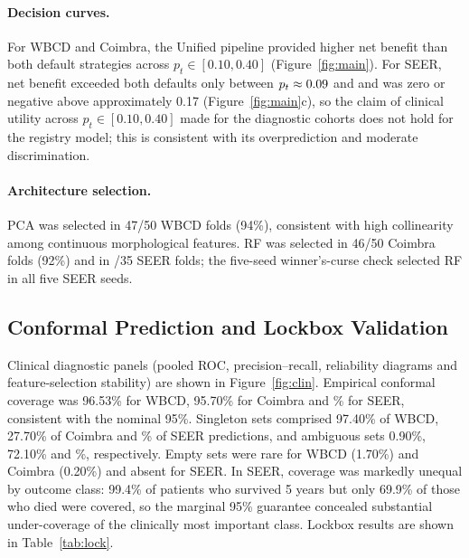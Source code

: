\documentclass[11pt,a4paper]{article}
\begin{document}
\paragraph{Decision curves.} For WBCD and Coimbra, the Unified pipeline provided higher net benefit than both default strategies across $p_t\in[0.10,0.40]$ (Figure~\ref{fig:main}). For SEER, net benefit exceeded both defaults only between $p_t\approx0.09$ and \seerDCAhi{} and was zero or negative above approximately 0.17 (Figure~\ref{fig:main}c), so the claim of clinical utility across $p_t\in[0.10,0.40]$ made for the diagnostic cohorts does not hold for the registry model; this is consistent with its overprediction and moderate discrimination.

\paragraph{Architecture selection.} PCA was selected in 47/50 WBCD folds (94\%), consistent with high collinearity among continuous morphological features. RF was selected in 46/50 Coimbra folds (92\%) and in \seerRFfolds/35 SEER folds; the five-seed winner's-curse check selected RF in all five SEER seeds.

\subsection{Conformal Prediction and Lockbox Validation}\label{sec:conformal-prediction-and-lockb}
Clinical diagnostic panels (pooled ROC, precision--recall, reliability diagrams and feature-selection stability) are shown in Figure~\ref{fig:clin}. Empirical conformal coverage was 96.53\% for WBCD, 95.70\% for Coimbra and \seerConfCov\% for SEER, consistent with the nominal 95\%. Singleton sets comprised 97.40\% of WBCD, 27.70\% of Coimbra and \seerConfSingle\% of SEER predictions, and ambiguous sets 0.90\%, 72.10\% and \seerConfAmb\%, respectively. Empty sets were rare for WBCD (1.70\%) and Coimbra (0.20\%) and absent for SEER. In SEER, coverage was markedly unequal by outcome class: 99.4\% of patients who survived 5 years but only 69.9\% of those who died were covered, so the marginal 95\% guarantee concealed substantial under-coverage of the clinically most important class. Lockbox results are shown in Table~\ref{tab:lock}.
\end{document}
